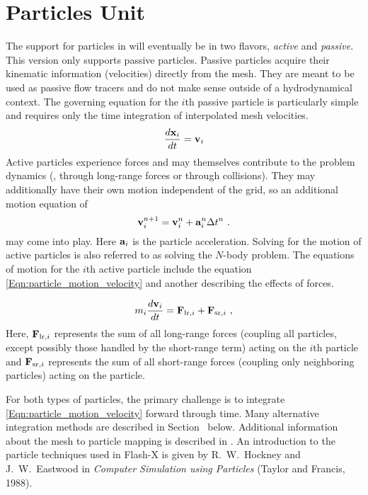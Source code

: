 \chapter{Particles Unit}
\label{Chp:Particles}

The support for particles in \flashx will eventually be in two
flavors, \emph{active} and \emph{passive}. This version only supports
passive particles. Passive particles acquire their kinematic information (velocities)
directly from the mesh. They are meant to be used as passive flow tracers and
do not make sense outside of a hydrodynamical context. The governing
equation for the $i$th passive particle is particularly simple and
requires only the time integration of interpolated mesh
velocities. \begin{equation}\label{Eqn:particle_motion_velocity}
{d{\bf x}_i\over dt}    =  {\bf v}_i 
\end{equation}
Active particles experience forces and may themselves contribute to
the problem dynamics (\eg, through long-range forces or through
collisions). They may additionally have their own motion independent
of the grid, so an additional motion equation of 
    \begin{equation}
    \label{Eq:particle_motion_acceleration}
      {\bf v}_i^{n+1} = {\bf v}_i^n + {\bf a}_i^n\Delta t^n ~.
    \end{equation}
may come into play. Here ${\bf a}_i$ is the particle
acceleration. Solving for the motion of active particles is also
referred to as solving the $N$-body problem. The equations of motion
for the $i$th active particle include the equation
\eqref{Eqn:particle_motion_velocity} and another describing the
effects of forces. 

\begin{equation} 
\label{Eqn:particle_motion_forces}
m_i{d{\bf v}_i\over dt} =  {\bf F}_{{\rm lr,}i} + {\bf F}_{{\rm sr,}i}\ ,
\end{equation}
Here, ${\bf F}_{{\rm lr,}i}$ represents the sum of all long-range forces
(coupling all particles, except possibly those handled by the short-range term)
acting on the $i$th particle and ${\bf F}_{{\rm sr,}i}$ represents the
sum of all short-range forces (coupling only neighboring particles)
acting on the particle.

For both types of particles, the primary challenge is to integrate
\eqref{Eqn:particle_motion_velocity} forward through time. Many
alternative integration methods are described in
Section~ below.  Additional
information about the mesh to particle mapping is described in
.  An introduction to the particle
techniques used in Flash-X is given by R.~W.~Hockney and J.~W.~Eastwood
in {\it Computer Simulation using Particles} (Taylor and Francis,
1988).



